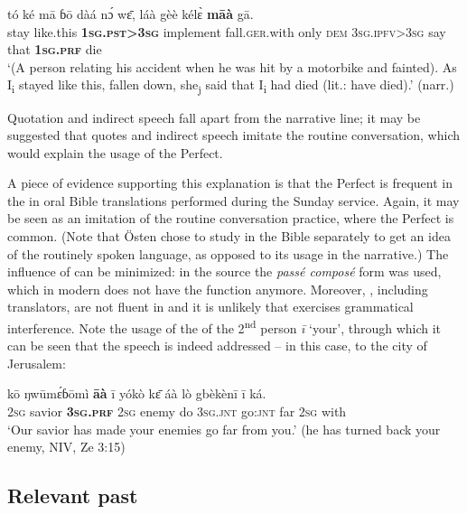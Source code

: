 \documentclass[output=paper,newtxmath,modfonts,nonflat,hidelinks]{langsci/langscibook}
\begin{document}
\begin{exe} \ex
\label{khachexquot2}
\gll 	tó	ké	mā	ɓō	dàá	nɔ́	wɛ̄, láà	gèè	kélɛ̀	\textbf{māà}	gā.		\\
	stay	like.this	\textbf{1\textsc{sg}.\textsc{pst}>3\textsc{sg}}	implement fall.\textsc{ger}.with	only	\textsc{dem}	3\textsc{sg}.\textsc{ipfv}>3\textsc{sg}	say	that	\textbf{1\textsc{sg}.\textsc{prf}}	die\\
\glt ‘(A person relating his accident when he was hit by a motorbike and fainted). As I\textsubscript{i} stayed like this, fallen down, she\textsubscript{j} said that I\textsubscript{i} had died (lit.: have died).’ (narr.)
\end{exe}

Quotation and indirect speech fall apart from the narrative line; it may be suggested that quotes and indirect speech imitate the routine conversation, which would explain the usage of the Perfect. 

A piece of evidence supporting this explanation is that the Perfect is frequent in the  in oral Bible translations performed during the Sunday service. Again, it may be seen as an imitation of the routine conversation practice, where the Perfect is common. (Note that Östen \citet{khachdahl2014} chose to study  in the Bible separately to get an idea of the routinely spoken language, as opposed to its usage in the narrative.) The influence of  can be minimized: in the  source the \textit{passé composé} form was used, which in modern  does not have the  function anymore. Moreover, , including  translators, are not fluent in  and it is unlikely that  exercises grammatical interference. Note the usage of the  of the 2\textsuperscript{nd} person \textit{ī} `your', through which it can be seen that the speech is indeed addressed -- in this case, to the city of Jerusalem:

\begin{exe}\ex
\gll kō ŋwūmɛ́ɓōmì \textbf{āà} ī yókò kɛ̄ áà lò gbèkènī ī ká.\\
\textsc{2sg} savior \textbf{\textsc{3sg.prf}} \textsc{2sg} enemy do \textsc{3sg.jnt} go:\textsc{jnt} far \textsc{2sg} with\\
\glt `Our savior has made your enemies go far from you.' (he has turned back your enemy, NIV, Ze 3:15)
\end{exe}


\subsection{Relevant past}
\end{document}

